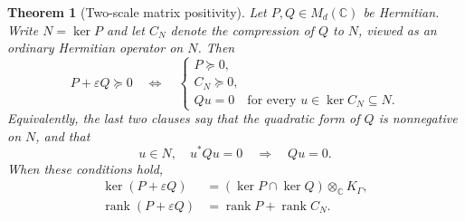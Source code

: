 \documentclass[11pt,oneside]{article}
\newtheorem{theorem}{Theorem}[section]
\theoremstyle{definition}
\theoremstyle{remark}
\newcommand{\C}{\mathbb C}
\newcommand{\rank}{\operatorname{rank}}
\newcommand{\eps}{\varepsilon}
\begin{document}
\begin{theorem}[Two-scale matrix positivity]\label{hnd:thm:twoscale}
Let $P,Q\in M_d(\C)$ be Hermitian. Write $N=\ker P$ and let
$C_N$ denote the compression of $Q$ to $N$,
viewed as an ordinary Hermitian operator on $N$.
Then
\begin{equation}\label{hnd:eq:twoscalecriterion}
 P+\eps Q\succeq0
 \quad\Longleftrightarrow\quad
 \begin{cases}
 P\succeq0,\\
 C_N\succeq0,\\
 Q u=0\quad\text{for every }u\in\ker C_N\subseteq N.
 \end{cases}
\end{equation}
Equivalently, the last two clauses say that the quadratic form of $Q$
is nonnegative on $N$, and that
\begin{equation}\label{hnd:eq:annihilationcondition}
 u\in N,\quad u^*Qu=0\quad\Longrightarrow\quad Qu=0.
\end{equation}
When these conditions hold,
\begin{align}
 \ker(P+\eps Q)&=(\ker P\cap\ker Q)\otimes_\C K_\Gamma,
 \label{hnd:eq:kernel}\\
 \rank(P+\eps Q)&=\rank P+\rank C_N.
 \label{hnd:eq:rank}
\end{align}
\end{theorem}
\end{document}
